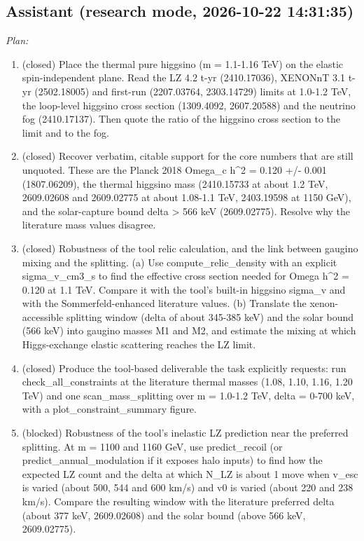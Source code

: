 \documentclass[11pt,a4paper]{article}
\begin{document}
\subsection*{Assistant \small(research mode, 2026-10-22 14:31:35)}
\textit{Plan:}\begin{enumerate}
  \item (closed) Place the thermal pure higgsino (m = 1.1-1.16 TeV) on the elastic spin-independent plane. Read the LZ 4.2 t-yr (2410.17036), XENONnT 3.1 t-yr (2502.18005) and first-run (2207.03764, 2303.14729) limits at 1.0-1.2 TeV, the loop-level higgsino cross section (1309.4092, 2607.20588) and the neutrino fog (2410.17137). Then quote the ratio of the higgsino cross section to the limit and to the fog.
  \item (closed) Recover verbatim, citable support for the core numbers that are still unquoted. These are the Planck 2018 Omega\_c h\textasciicircum{}2 = 0.120 +/- 0.001 (1807.06209), the thermal higgsino mass (2410.15733 at about 1.2 TeV, 2609.02608 and 2609.02775 at about 1.08-1.1 TeV, 2403.19598 at 1150 GeV), and the solar-capture bound delta \textgreater{} 566 keV (2609.02775). Resolve why the literature mass values disagree.
  \item (closed) Robustness of the tool relic calculation, and the link between gaugino mixing and the splitting. (a) Use compute\_relic\_density with an explicit sigma\_v\_cm3\_s to find the effective cross section needed for Omega h\textasciicircum{}2 = 0.120 at 1.1 TeV. Compare it with the tool's built-in higgsino sigma\_v and with the Sommerfeld-enhanced literature values. (b) Translate the xenon-accessible splitting window (delta of about 345-385 keV) and the solar bound (566 keV) into gaugino masses M1 and M2, and estimate the mixing at which Higgs-exchange elastic scattering reaches the LZ limit.
  \item (closed) Produce the tool-based deliverable the task explicitly requests: run check\_all\_constraints at the literature thermal masses (1.08, 1.10, 1.16, 1.20 TeV) and one scan\_mass\_splitting over m = 1.0-1.2 TeV, delta = 0-700 keV, with a plot\_constraint\_summary figure.
  \item (blocked) Robustness of the tool's inelastic LZ prediction near the preferred splitting. At m = 1100 and 1160 GeV, use predict\_recoil (or predict\_annual\_modulation if it exposes halo inputs) to find how the expected LZ count and the delta at which N\_LZ is about 1 move when v\_esc is varied (about 500, 544 and 600 km/s) and v0 is varied (about 220 and 238 km/s). Compare the resulting window with the literature preferred delta (about 377 keV, 2609.02608) and the solar bound (above 566 keV, 2609.02775).
\end{enumerate}
\end{document}
